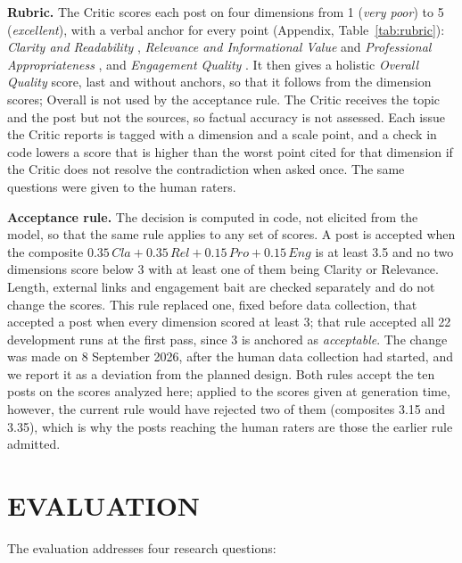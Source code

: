 \documentclass[a4paper,twoside]{article}
\begin{document}
\textbf{Rubric.} The Critic scores each post on four dimensions from 1 (\emph{very poor}) to 5 (\emph{excellent}), with a verbal anchor for every point (Appendix, Table~\ref{tab:rubric}): \emph{Clarity and Readability} \cite{rooderkerk2016nocomment}, \emph{Relevance and Informational Value} and \emph{Professional Appropriateness} \cite{usera2026linkedin}, and \emph{Engagement Quality} \cite{usera2025predicts}. It then gives a holistic \emph{Overall Quality} score, last and without anchors, so that it follows from the dimension scores; Overall is not used by the acceptance rule. The Critic receives the topic and the post but not the sources, so factual accuracy is not assessed. Each issue the Critic reports is tagged with a dimension and a scale point, and a check in code lowers a score that is higher than the worst point cited for that dimension if the Critic does not resolve the contradiction when asked once. The same questions were given to the human raters.

\textbf{Acceptance rule.} The decision is computed in code, not elicited from the model, so that the same rule applies to any set of scores. A post is accepted when the composite $0.35\,\mathit{Cla} + 0.35\,\mathit{Rel} + 0.15\,\mathit{Pro} + 0.15\,\mathit{Eng}$ is at least 3.5 and no two dimensions score below 3 with at least one of them being Clarity or Relevance. Length, external links and engagement bait are checked separately and do not change the scores. This rule replaced one, fixed before data collection, that accepted a post when every dimension scored at least 3; that rule accepted all 22 development runs at the first pass, since 3 is anchored as \emph{acceptable}. The change was made on 8 September 2026, after the human data collection had started, and we report it as a deviation from the planned design. Both rules accept the ten posts on the scores analyzed here; applied to the scores given at generation time, however, the current rule would have rejected two of them (composites 3.15 and 3.35), which is why the posts reaching the human raters are those the earlier rule admitted.

\section{\uppercase{Evaluation}}
\label{sec:evaluation}

The evaluation addresses four research questions:
\end{document}

